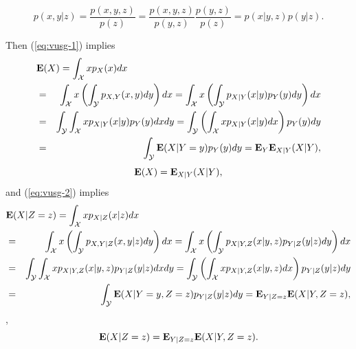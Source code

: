 \begin{equation}
\label{eq:vusg-2}
p(x,y|z)
= \frac{p(x,y,z)}{p(z)}
= \frac{p(x,y,z)}{p(y,z)} \frac{p(y,z)}{p(z)}
= p(x|y,z) p(y|z).
\end{equation}

Then (\ref{eq:vusg-1}) implies
\begin{eqnarray*}
\lefteqn{
\Expect(X)
= \int_\suppx x p_X(x) dx
}
\\
&=& \int_\suppx x \left(\int_\suppy p_{X,Y}(x,y) dy \right) dx
= \int_\suppx x \left(\int_\suppy p_{X|Y}(x|y)p_Y(y) dy \right) dx
\\
&=& \int_\suppy \int_\suppx x p_{X|Y}(x|y)p_Y(y) dx dy
= \int_\suppy \left( \int_\suppx x p_{X|Y}(x|y) dx \right) p_Y(y) dy
\\
&=& \int_\suppy \Expect (X|Y=y) p_Y(y) dy
= \Expect_Y \Expect_{X|Y} (X|Y),
\end{eqnarray*}
\begin{equation}
\mathbf{E}(X) = \mathbf{E}_{X|Y} (X|Y),
\end{equation}
and (\ref{eq:vusg-2}) implies
\begin{eqnarray*}
\lefteqn{
\Expect(X|Z=z)
= \int_\suppx x p_{X|Z}(x|z) dx
}
\\
&=& \int_\suppx x \left(\int_{\suppy} p_{X,Y|Z}(x,y|z) dy \right) dx
= \int_\suppx x \left(\int_{\suppy} p_{X|Y,Z}(x|y,z) p_{Y|Z}(y|z) dy \right) dx
\\
&=& \int_\suppy \int_\suppx x p_{X|Y,Z}(x|y,z) p_{Y|Z}(y|z) dx dy
= \int_\suppy \left( \int_\suppx x p_{X|Y,Z}(x|y,z) dx \right) p_{Y|Z}(y|z) dy
\\
&=& \int_\suppy \Expect(X|Y=y,Z=z) p_{Y|Z}(y|z) dy
= \Expect_{Y|Z=z} \Expect(X|Y,Z=z),
\end{eqnarray*}
\ie,
\begin{equation}
\label{eq:dkci}
\mathbf{E}(X|Z=z)
= \mathbf{E}_{Y|Z=z} \mathbf{E}(X|Y,Z=z).
\end{equation}
